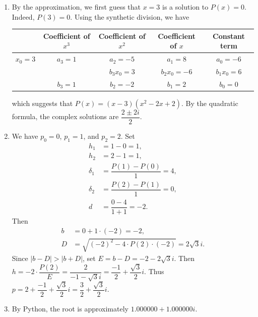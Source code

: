 \documentclass[11pt]{article}
\theoremstyle{break}
\numberwithin{equation}{theorem}
\begin{document}
\begin{enumerate}
\begin{center}
    \end{center}
    \item By the approximation, we first guess that $x=3$ is a solution to $P(x)=0$. Indeed, $P(3)=0$. Using the synthetic division, we have
    \begin{center}
        \begin{tabular}{|c|c|c|c|c|}
            \hline
            & Coefficient of $x^3$ & Coefficient of $x^2$ & Coefficient of $x$ & Constant term \\
            \hline
            $x_0=3$ & $a_3=1$ & $a_2=-5$ & $a_1=8$ & $a_0=-6$\\
            \hline
            &  & $b_3x_0=3$ & $b_2x_0=-6$ & $b_1x_0=6$\\
            \hline
            & $b_3=1$ & $b_2=-2$ & $b_1=2$ & $b_0=0$\\
            \hline
        \end{tabular}
    \end{center}
    which suggests that $P(x)=(x-3)(x^2-2x+2)$. By the quadratic formula, the complex solutions are $\dfrac{2\pm2i}{2}$.
    \item We have $p_0=0$, $p_1=1$, and $p_2=2$. Set
    \begin{align*}
        h_1&=1-0=1,\\
        h_2&=2-1=1,\\
        \delta_1&=\dfrac{P(1)-P(0)}{1}=4,\\
        \delta_2&=\dfrac{P(2)-P(1)}{1}=0,\\
        d&=\dfrac{0-4}{1+1}=-2.
    \end{align*}
    Then
    \begin{align*}
        b&=0+1\cdot(-2)=-2,\\
        D&=\sqrt{(-2)^2-4\cdot P(2)\cdot(-2)}=2\sqrt{3}i.
    \end{align*}
    Since $|b-D|>|b+D|$, set $E=b-D=-2-2\sqrt{3}i$. Then $h=-2\cdot\dfrac{P(2)}{E}=\dfrac{2}{-1-\sqrt{3}i}=\dfrac{-1}{2}+\dfrac{\sqrt{3}}{2}i$. Thus $p=2+\dfrac{-1}{2}+\dfrac{\sqrt{3}}{2}i=\dfrac{3}{2}+\dfrac{\sqrt{3}}{2}i$.
    \item By Python, the root is approximately $1.000000+1.000000i$.
    \begin{center}

\end{center}
\end{enumerate}
\end{document}
